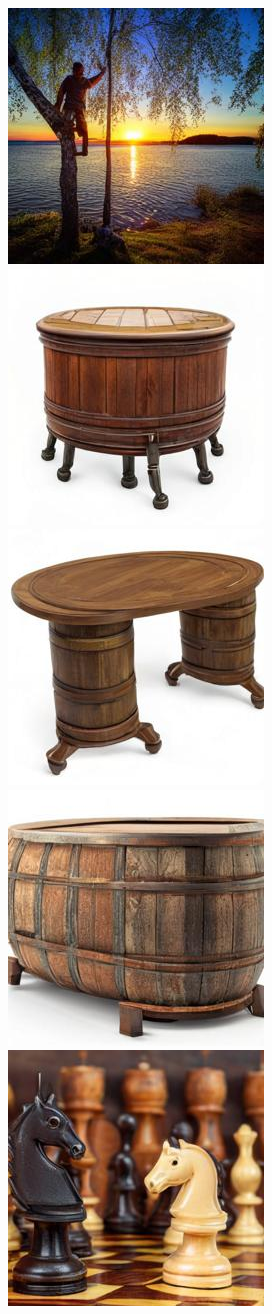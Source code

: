 \begin{figure}[h!]
\begin{subfigure}[t]{0.32\linewidth}
	\includegraphics[width=0.320\linewidth]{figs/samples_appendix_3/adjmat_cfg_2_ode_prompt_69_image_3.jpg}\\ 
	\includegraphics[width=0.320\linewidth]{figs/samples_appendix_3/adjmat_cfg_2_ode_prompt_73_image_1.jpg}\;%
	\includegraphics[width=0.320\linewidth]{figs/samples_appendix_3/adjmat_cfg_2_ode_prompt_73_image_2.jpg}\;%
	\includegraphics[width=0.320\linewidth]{figs/samples_appendix_3/adjmat_cfg_2_ode_prompt_73_image_3.jpg}\\ 
	\includegraphics[width=0.320\linewidth]{figs/samples_appendix_3/adjmat_cfg_2_ode_prompt_75_image_1.jpg}\;%

\end{subfigure}
\end{figure}
